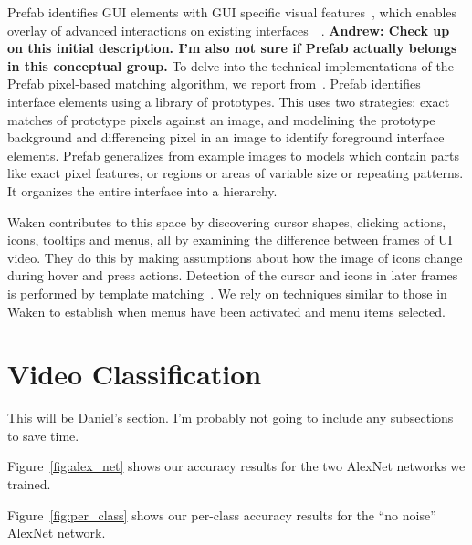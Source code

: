 \documentclass[10pt]{article}
\begin{document}
Prefab identifies GUI elements with GUI specific visual features~\cite{dixon_prefab_2010}, which
enables overlay of advanced interactions on existing
interfaces~\cite{dixon_content_2011}~\cite{dixon_general-purpose_2012}.  \textbf{Andrew: Check up on
this initial description.  I'm also not sure if Prefab actually belongs in this conceptual group.}
To delve into the technical implementations of the Prefab pixel-based matching algorithm, we report
from~\cite{dixon_general-purpose_2012}.  Prefab identifies interface elements using a library of
prototypes.  This uses two strategies: exact matches of prototype pixels against an image, and
modelining the prototype background and differencing pixel in an image to identify foreground
interface elements.  Prefab generalizes from example images to models which contain parts like exact
pixel features, or regions or areas of variable size or repeating patterns.  It organizes the entire
interface into a hierarchy.

Waken contributes to this space by discovering cursor shapes, clicking actions, icons, tooltips and
menus, all by examining the difference between frames of UI video.  They do this by making
assumptions about how the image of icons change during hover and press actions.  Detection of the
cursor and icons in later frames is performed by template matching~\cite{banovic_waken_2012}.  We
rely on techniques similar to those in Waken to establish when menus have been activated and menu
items selected.


\section{Video Classification}

This will be Daniel's section. I'm probably not going to include any subsections to save time.

Figure~\ref{fig:alex_net} shows our accuracy results for the two AlexNet networks we trained.

Figure~\ref{fig:per_class} shows our per-class accuracy results for the ``no noise'' AlexNet
network.
\end{document}
